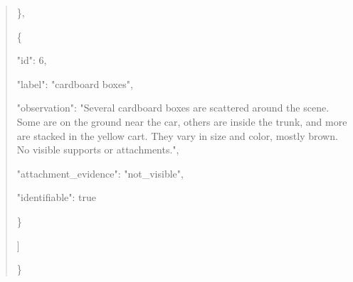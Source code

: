 \documentclass[10pt,a4paper]{article}
\begin{document}
\begin{quote}
    \},\allowbreak{}\par
    \{\par
      "id":\allowbreak{} 6,\allowbreak{}\par
      "label":\allowbreak{} "cardboard boxes",\allowbreak{}\par
      "observation":\allowbreak{} "Several cardboard boxes are scattered around the scene. Some are on the ground near the car,\allowbreak{} others are inside the trunk,\allowbreak{} and more are stacked in the yellow cart. They vary in size and color,\allowbreak{} mostly brown. No visible supports or attachments.",\allowbreak{}\par
      "attachment\_evidence":\allowbreak{} "not\_visible",\allowbreak{}\par
      "identifiable":\allowbreak{} true\par
    \}\par
  ]\par
\}
\end{quote}
\end{document}

